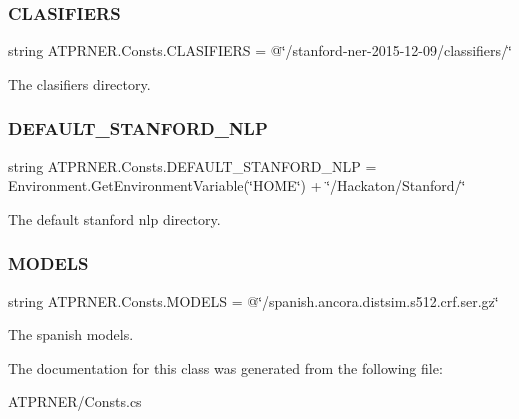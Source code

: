 \subsubsection{\texorpdfstring{C\+L\+A\+S\+I\+F\+I\+E\+RS}{CLASIFIERS}}
{\footnotesize\ttfamily string A\+T\+P\+R\+N\+E\+R.\+Consts.\+C\+L\+A\+S\+I\+F\+I\+E\+RS = @\char`\"{}/stanford-\/ner-\/2015-\/12-\/09/classifiers/\char`\"{}\hspace{0.3cm}{\ttfamily [static]}}



The clasifiers directory. 

\hypertarget{class_a_t_p_r_n_e_r_1_1_consts_a5552c464404a06a1cb4903e9e8a6fd19}{}\label{class_a_t_p_r_n_e_r_1_1_consts_a5552c464404a06a1cb4903e9e8a6fd19} 
\subsubsection{\texorpdfstring{D\+E\+F\+A\+U\+L\+T\+\_\+\+S\+T\+A\+N\+F\+O\+R\+D\+\_\+\+N\+LP}{DEFAULT\_STANFORD\_NLP}}
{\footnotesize\ttfamily string A\+T\+P\+R\+N\+E\+R.\+Consts.\+D\+E\+F\+A\+U\+L\+T\+\_\+\+S\+T\+A\+N\+F\+O\+R\+D\+\_\+\+N\+LP = Environment.\+Get\+Environment\+Variable(\char`\"{}H\+O\+ME\char`\"{}) + \char`\"{}/Hackaton/Stanford/\char`\"{}\hspace{0.3cm}{\ttfamily [static]}}



The default stanford nlp directory. 

\hypertarget{class_a_t_p_r_n_e_r_1_1_consts_a2e80ccd5f9a0b20cf5ce31386604a3b2}{}\label{class_a_t_p_r_n_e_r_1_1_consts_a2e80ccd5f9a0b20cf5ce31386604a3b2} 
\subsubsection{\texorpdfstring{M\+O\+D\+E\+LS}{MODELS}}
{\footnotesize\ttfamily string A\+T\+P\+R\+N\+E\+R.\+Consts.\+M\+O\+D\+E\+LS = @\char`\"{}/spanish.\+ancora.\+distsim.\+s512.\+crf.\+ser.\+gz\char`\"{}\hspace{0.3cm}{\ttfamily [static]}}



The spanish models. 



The documentation for this class was generated from the following file\+:\begin{DoxyCompactItemize}
\item 
A\+T\+P\+R\+N\+E\+R/Consts.\+cs\end{DoxyCompactItemize}
